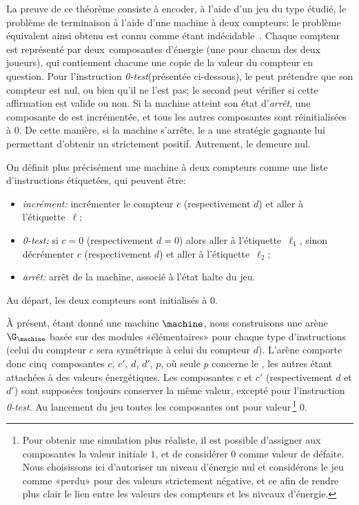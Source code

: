 \newcommand\tjztest{\textit{0-test}\xspace}
\newcommand\tjhalt {\textsf{halte}\xspace}
\newcommand\tjstop {\textsf{arrêt}\xspace}
\newcommand\tjstopq{\textsf{arrêt$'$}\xspace}
\newcommand\tjcheck{\textsf{vérif}\xspace}
La preuve de ce théorème consiste à encoder, à l'aide d'un jeu du type étudié, le problème de terminaison à l'aide d'une machine à deux compteurs: le problème équivalent ainsi obtenu est connu comme étant indécidable~\cite{minsky67}.
Chaque compteur est représenté par deux~composantes d'énergie (une pour chacun des deux joueurs), qui contiennent chacune une copie de la valeur du compteur en question.
Pour l'instruction \tjztest (présentée ci-dessous), le \jo peut prétendre que son compteur est nul, ou bien qu'il ne l'est pas; le second  peut vérifier si cette affirmation est valide ou non.
Si la machine atteint son état d'\textit{arrêt}, une composante de  est incrémentée, et tous les autres composantes sont réinitialisées à $0$.
De cette manière, si la machine s'arrête, le \jo a une stratégie gagnante lui permettant d'obtenir un  strictement positif.
Autrement, le  demeure nul.

On définit plus précisément une machine à deux compteurs comme une liste d'instructions étiquetées, qui peuvent être:
\begin{itemize}
    \item \textit{incrément:} incrémenter le compteur $c$ (respectivement $d$) et aller à l'étiquette~$\ell$;
    \item \textit{\tjztest:} si $c=0$ (respectivement $d=0$) alors aller à l'étiquette~$\ell_1$, sinon décrémenter $c$ (respectivement $d$) et aller à l'étiquette~$\ell_2$;
    \item \textit{arrêt:} arrêt de la machine, associé à l'état \tjhalt du jeu.
\end{itemize}
Au départ, les deux compteurs sont initialisés à $0$.

À présent, étant donné une machine $\machine$, nous construisons une arène $\G_\machine$ basée sur des modules «élémentaires» pour chaque type d'instructions (celui du compteur $c$ sera symétrique à celui du compteur $d$).
L'arène comporte donc cinq~composantes $c$, $c'$, $d$, $d'$, $p$, où seule $p$ concerne le , les autres étant attachées à des valeurs énergétiques.
Les composantes $c$ et $c'$ (respectivement $d$ et $d'$) sont supposées toujours conserver la même valeur, excepté pour l'instruction \tjztest.
Au lancement du jeu toutes les composantes ont pour valeur\,\footnote{Pour obtenir une simulation plus réaliste, il est possible d'assigner aux composantes la valeur initiale $1$, et de considérer $0$ comme valeur de défaite. Nous choisissons ici d'autoriser un niveau d'énergie nul et considérons le jeu comme «perdu» pour des valeurs strictement négative, et ce afin de rendre plus clair le lien entre les valeurs des compteurs et les niveaux d'énergie.} $0$.

